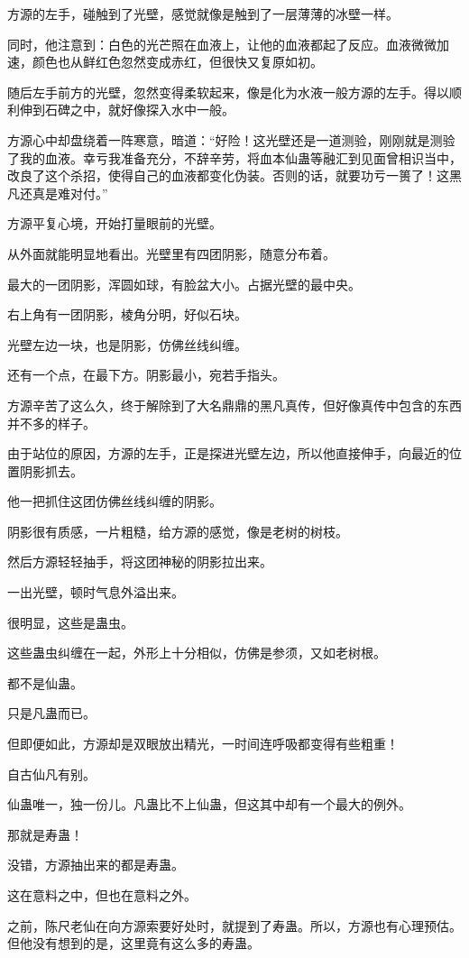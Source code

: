 \begin{this_body}
方源的左手，碰触到了光壁，感觉就像是触到了一层薄薄的冰壁一样。

同时，他注意到：白色的光芒照在血液上，让他的血液都起了反应。血液微微加速，颜色也从鲜红色忽然变成赤红，但很快又复原如初。

随后左手前方的光壁，忽然变得柔软起来，像是化为水液一般方源的左手。得以顺利伸到石碑之中，就好像探入水中一般。

方源心中却盘绕着一阵寒意，暗道：“好险！这光壁还是一道测验，刚刚就是测验了我的血液。幸亏我准备充分，不辞辛劳，将血本仙蛊等融汇到见面曾相识当中，改良了这个杀招，使得自己的血液都变化伪装。否则的话，就要功亏一篑了！这黑凡还真是难对付。”

方源平复心境，开始打量眼前的光壁。

从外面就能明显地看出。光壁里有四团阴影，随意分布着。

最大的一团阴影，浑圆如球，有脸盆大小。占据光壁的最中央。

右上角有一团阴影，棱角分明，好似石块。

光壁左边一块，也是阴影，仿佛丝线纠缠。

还有一个点，在最下方。阴影最小，宛若手指头。

方源辛苦了这么久，终于解除到了大名鼎鼎的黑凡真传，但好像真传中包含的东西并不多的样子。

由于站位的原因，方源的左手，正是探进光壁左边，所以他直接伸手，向最近的位置阴影抓去。

他一把抓住这团仿佛丝线纠缠的阴影。

阴影很有质感，一片粗糙，给方源的感觉，像是老树的树枝。

然后方源轻轻抽手，将这团神秘的阴影拉出来。

一出光壁，顿时气息外溢出来。

很明显，这些是蛊虫。

这些蛊虫纠缠在一起，外形上十分相似，仿佛是参须，又如老树根。

都不是仙蛊。

只是凡蛊而已。

但即便如此，方源却是双眼放出精光，一时间连呼吸都变得有些粗重！

自古仙凡有别。

仙蛊唯一，独一份儿。凡蛊比不上仙蛊，但这其中却有一个最大的例外。

那就是寿蛊！

没错，方源抽出来的都是寿蛊。

这在意料之中，但也在意料之外。

之前，陈尺老仙在向方源索要好处时，就提到了寿蛊。所以，方源也有心理预估。但他没有想到的是，这里竟有这么多的寿蛊。


\end{this_body}
